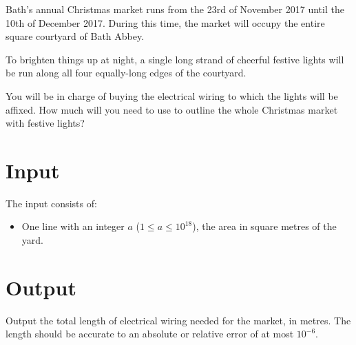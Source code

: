 
%
Bath's annual Christmas market runs from the 23rd of November 2017 until the
10th of December 2017. During this time, the market will occupy the entire
square courtyard of Bath Abbey.

To brighten things up at night, a single long strand of cheerful festive lights
will be run along all four equally-long edges of the courtyard.

You will be in charge of buying the electrical wiring to which the lights will
be affixed. How much will you need to use to outline the whole Christmas market
with festive lights?

\section*{Input}
The input consists of:
\begin{itemize}
	\item One line with an integer $a$ ($1 \le a \le 10^{18}$), the area in
square metres of the yard.
\end{itemize}

\section*{Output}

Output the total length of electrical wiring needed for the market, in metres.
The length should be accurate to an absolute or relative error of at most $10^{-6}$.
